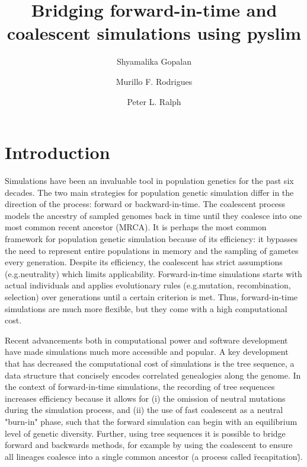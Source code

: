 \documentclass[12pt]{article}
\newcommand*{\eg}{e.g.\xcomma}
\begin{document}
\title{Bridging forward-in-time and coalescent simulations using pyslim}
\author[1]{Shyamalika Gopalan}
\author[2,3]{Murillo F. Rodrigues}
\author[3,4]{Peter L. Ralph}


\maketitle

\date{}

\section*{Introduction}
Simulations have been an invaluable tool in population genetics for the past six decades.
The two main strategies for population genetic simulation differ in the direction of the process: forward or backward-in-time.
The coalescent process models the ancestry of sampled genomes back in time until they coalesce into one most common recent ancestor (MRCA).
It is perhaps the most common framework for population genetic simulation because of its efficiency:
it bypasses the need to represent entire populations in memory and the sampling of gametes every generation.
Despite its efficiency, the coalescent has strict assumptions (\eg neutrality) which limits applicability.
Forward-in-time simulations starts with actual individuals and applies evolutionary rules (\eg mutation, recombination, selection) over generations until a certain criterion is met.
Thus, forward-in-time simulations are much more flexible, but they come with a high computational cost.

Recent advancements both in computational power and software development have made simulations much more accessible and popular.
A key development that has decreased the computational cost of simulations is the tree sequence,
a data structure that concisely encodes correlated genealogies along the genome.
In the context of forward-in-time simulations,
the recording of tree sequences increases efficiency because it allows for
(i) the omission of neutral mutations during the simulation process, and
(ii) the use of fast coalescent as a neutral "burn-in" phase,
such that the forward simulation can begin with an equilibrium level of genetic diversity.
Further, using tree sequences it is possible to bridge forward and backwards methods, 
for example by using the coalescent to ensure all lineages coalesce into a single common ancestor (a process called \"recapitation\").
\end{document}
